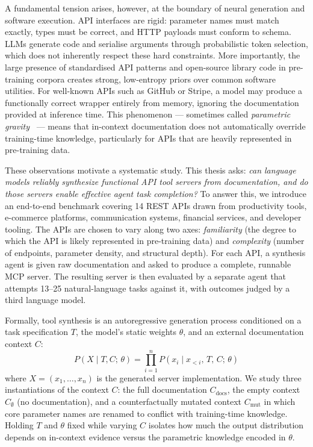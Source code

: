 \documentclass[12pt]{report}
\begin{document}
A fundamental tension arises, however, at the boundary of neural generation
and software execution. API interfaces are rigid: parameter names must match
exactly, types must be correct, and HTTP payloads must conform to schema.
LLMs generate code and serialise arguments through probabilistic token
selection, which does not inherently respect these hard constraints. More
importantly, the large presence of standardised API patterns and open-source
library code in pre-training corpora creates strong, low-entropy priors over
common software utilities. For well-known APIs such as GitHub or Stripe,
a model may produce a functionally correct wrapper entirely from memory,
ignoring the documentation provided at inference time. This phenomenon ---
sometimes called \emph{parametric gravity}~\cite{mallen2023knowns,juice2025} ---
means that in-context documentation does not automatically override
training-time knowledge, particularly for APIs that are heavily represented
in pre-training data.

These observations motivate a systematic study. This thesis asks: \emph{can language models reliably
synthesize functional API tool servers from documentation, and do those
servers enable effective agent task completion?} To answer this, we introduce
an end-to-end benchmark covering 14 REST APIs drawn from productivity tools,
e-commerce platforms, communication systems, financial services, and developer
tooling. The APIs are chosen to vary along two axes: \emph{familiarity}
(the degree to which the API is likely represented in pre-training data) and
\emph{complexity} (number of endpoints, parameter density, and structural
depth). For each API, a synthesis agent is given raw documentation and asked
to produce a complete, runnable MCP server. The resulting server is then
evaluated by a separate agent that attempts 13--25 natural-language tasks
against it, with outcomes judged by a third language model.

Formally, tool synthesis is an autoregressive generation process conditioned
on a task specification $T$, the model's static weights $\theta$, and an
external documentation context $C$:
%
\begin{equation}
  P(X \mid T, C;\, \theta)
  = \prod_{i=1}^{n} P(x_i \mid x_{<i},\, T,\, C;\, \theta)
  \label{eq:synthesis}
\end{equation}
%
where $X = (x_1, \ldots, x_n)$ is the generated server implementation.
We study three instantiations of the context $C$: the full documentation
$C_{\text{docs}}$, the empty context $C_{\emptyset}$ (no documentation), and
a counterfactually mutated context $C_{\text{mut}}$ in which core parameter
names are renamed to conflict with training-time knowledge. Holding $T$ and
$\theta$ fixed while varying $C$ isolates how much the output distribution
depends on in-context evidence versus the parametric knowledge encoded in
$\theta$.
\end{document}
